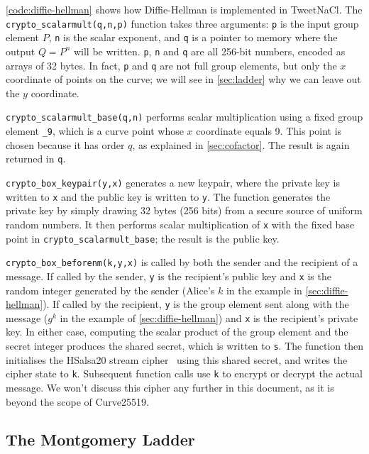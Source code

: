 \documentclass{article}
\begin{document}
\autoref{code:diffie-hellman} shows how Diffie-Hellman is implemented in TweetNaCl.
The \verb|crypto_scalarmult(q,n,p)| function takes three arguments: \verb|p| is the input group element $P$, \verb|n| is the scalar exponent, and \verb|q| is a pointer to memory where the output $Q=P^n$ will be written.
\verb|p|, \verb|n| and \verb|q| are all 256-bit numbers, encoded as arrays of 32 bytes.
In fact, \verb|p| and \verb|q| are not full group elements, but only the $x$ coordinate of points on the curve; we will see in \autoref{sec:ladder} why we can leave out the $y$ coordinate.

\verb|crypto_scalarmult_base(q,n)| performs scalar multiplication using a fixed group element \verb|_9|, which is a curve point whose $x$ coordinate equals 9.
This point is chosen because it has order $q$, as explained in \autoref{sec:cofactor}.
The result is again returned in \verb|q|.

\verb|crypto_box_keypair(y,x)| generates a new keypair, where the private key is written to \verb|x| and the public key is written to \verb|y|.
The function generates the private key by simply drawing 32 bytes (256 bits) from a secure source of uniform random numbers.
It then performs scalar multiplication of \verb|x| with the fixed base point in \verb|crypto_scalarmult_base|; the result is the public key.

\verb|crypto_box_beforenm(k,y,x)| is called by both the sender and the recipient of a message.
If called by the sender, \verb|y| is the recipient's public key and \verb|x| is the random integer generated by the sender (Alice's $k$ in the example in \autoref{sec:diffie-hellman}).
If called by the recipient, \verb|y| is the group element sent along with the message ($g^k$ in the example of \autoref{sec:diffie-hellman}) and \verb|x| is the recipient's private key.
In either case, computing the scalar product of the group element and the secret integer produces the shared secret, which is written to \verb|s|.
The function then initialises the HSalsa20 stream cipher~\cite{Bernstein:2014ca} using this shared secret, and writes the cipher state to \verb|k|.
Subsequent function calls use \verb|k| to encrypt or decrypt the actual message.
We won't discuss this cipher any further in this document, as it is beyond the scope of Curve25519.

\subsection{The Montgomery Ladder}\label{sec:ladder}
\end{document}

